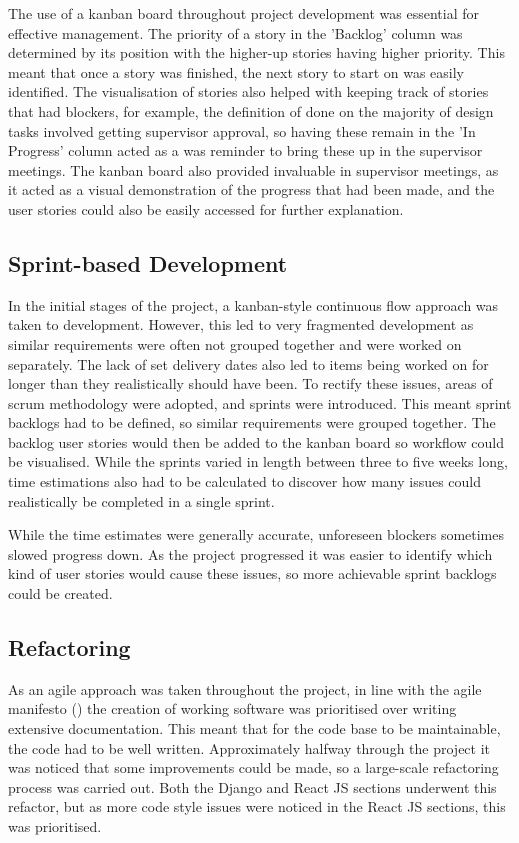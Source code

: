 \documentclass[l4proj.tex]{subfiles}
\begin{document}
The use of a kanban board throughout project development was essential for effective management. The priority of a story in the 'Backlog' column was determined by its position with the higher-up stories having higher priority. This meant that once a story was finished, the next story to start on was easily identified. The visualisation of stories also helped with keeping track of stories that had blockers, for example, the definition of done on the majority of design tasks involved getting supervisor approval, so having these remain in the 'In Progress' column acted as a was reminder to bring these up in the supervisor meetings. The kanban board also provided invaluable in supervisor meetings, as it acted as a visual demonstration of the progress that had been made, and the user stories could also be easily accessed for further explanation.


\subsection{Sprint-based Development}
In the initial stages of the project, a kanban-style continuous flow approach was taken to development. However, this led to very fragmented development as similar requirements were often not grouped together and were worked on separately. The lack of set delivery dates also led to items being worked on for longer than they realistically should have been. To rectify these issues, areas of scrum methodology were adopted, and sprints were introduced. This meant sprint backlogs had to be defined, so similar requirements were grouped together. The backlog user stories would then be added to the kanban board so workflow could be visualised. While the sprints varied in length between three to five weeks long, time estimations also had to be calculated to discover how many issues could realistically be completed in a single sprint. 

While the time estimates were generally accurate, unforeseen blockers sometimes slowed progress down. As the project progressed it was easier to identify which kind of user stories would cause these issues, so more achievable sprint backlogs could be created. 


\subsection{Refactoring}
 As an agile approach was taken throughout the project, in line with the agile manifesto (\cite{Kent2001(manifesto)}) the creation of working software was prioritised over writing extensive documentation. This meant that for the code base to be maintainable, the code had to be well written. Approximately halfway through the project it was noticed that some improvements could be made, so a large-scale refactoring process was carried out. Both the Django and React JS sections underwent this refactor, but as more code style issues were noticed in the React JS sections, this was prioritised.
\end{document}
